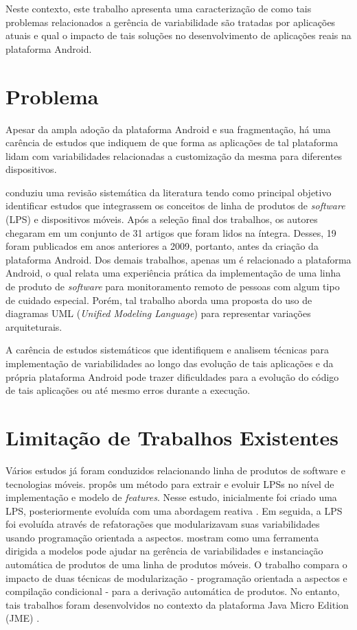 Neste contexto, este trabalho apresenta uma caracterização de como tais problemas
relacionados a gerência de variabilidade são tratadas por aplicações atuais e
qual o impacto de tais soluções no desenvolvimento de aplicações reais na plataforma
Android.

\section{Problema}

Apesar da ampla adoção da plataforma Android e sua fragmentação, há uma carência
de estudos que indiquem de que forma as aplicações de tal plataforma lidam com
variabilidades relacionadas a customização da mesma para diferentes dispositivos. 

 conduziu uma revisão sistemática da literatura tendo como
principal objetivo identificar estudos que integrassem os conceitos de linha de
produtos de \textit{software} (LPS) e dispositivos móveis. Após a seleção final
dos trabalhos, os autores chegaram em um conjunto de 31 artigos que foram lidos
na íntegra. Desses, 19 foram publicados em anos anteriores a 2009, portanto, antes
da criação da plataforma Android. Dos demais trabalhos, apenas um é relacionado a
plataforma Android, o qual relata uma experiência prática da implementação de uma
linha de produto de \textit{software} para monitoramento remoto de pessoas com
algum tipo de cuidado especial. Porém, tal trabalho aborda uma proposta do uso de
diagramas UML (\textit{Unified Modeling Language}) para representar variações arquiteturais.

A carência de estudos sistemáticos que identifiquem e analisem técnicas para
implementação de variabilidades ao longo das evolução de tais aplicações e da
própria plataforma Android pode trazer dificuldades para a evolução do código de
tais aplicações ou até mesmo erros durante a execução.

\section{Limitação de Trabalhos Existentes}

Vários estudos já foram conduzidos relacionando linha de produtos de software e
tecnologias móveis.  propôs um método para extrair e evoluir LPSs
no nível de implementação e modelo de \textit{features}.  Nesse estudo, inicialmente
foi criado uma LPS, posteriormente evoluída com uma abordagem reativa \cite{Krueger2002}.
Em seguida, a LPS foi evoluída através de refatorações que modularizavam suas
variabilidades usando programação orientada a aspectos.  mostram
como uma ferramenta dirigida a modelos pode ajudar na gerência de variabilidades
e instanciação automática de produtos de uma linha de produtos móveis. O trabalho
compara o impacto de duas técnicas de modularização - programação orientada a aspectos
e compilação condicional - para a derivação automática de produtos. No entanto,
tais trabalhos foram desenvolvidos no contexto da plataforma Java Micro Edition (JME) \cite{oraclejme}.

